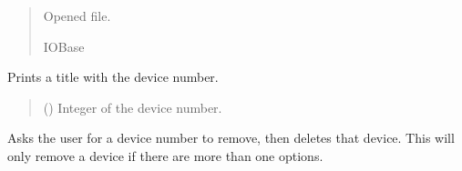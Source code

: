 \documentclass[letterpaper,10pt,english]{sphinxmanual}
\begin{document}
\begin{fulllineitems}
\begin{fulllineitems}
\begin{quote}
\begin{description}
\sphinxAtStartPar
Opened file.

\sphinxAtStartPar
IOBase

\end{description}\end{quote}

\end{fulllineitems}


\begin{fulllineitems}
\label{\detokenize{Setup.SetupOneDevice:Setup.SetupOneDevice.Setup_PodInterface.SetupInterface._PrintDeviceNumber}}
\pysigstartsignatures
{}
\pysigstopsignatures
\sphinxAtStartPar
Prints a title with the device number.
\begin{quote}\begin{description}
\sphinxAtStartPar
{} () \textendash{} Integer of the device number.

\end{description}\end{quote}

\end{fulllineitems}


\begin{fulllineitems}
\label{\detokenize{Setup.SetupOneDevice:Setup.SetupOneDevice.Setup_PodInterface.SetupInterface._RemoveDevice}}
\pysigstartsignatures
{}
\pysigstopsignatures
\sphinxAtStartPar
Asks the user for a device number to remove, then deletes that device. This will         only remove a device if there are more than one options.

\end{fulllineitems}


\end{fulllineitems}
\end{document}
